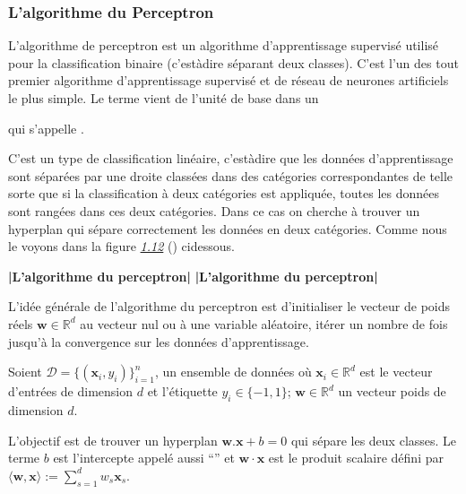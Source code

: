 \documentclass[letterpaper,11pt,english]{sphinxmanual}
\begin{document}
\subsubsection{L’algorithme du Perceptron}
\label{\detokenize{chapter3:lalgorithme-du-perceptron}}
\sphinxAtStartPar
L’algorithme de perceptron est un algorithme d’apprentissage supervisé
utilisé pour la classification binaire (c’est\sphinxhyphen{}à\sphinxhyphen{}dire séparant deux
classes). C’est l’un des tout premier algorithme d’apprentissage
supervisé et de réseau de neurones artificiels le plus simple. Le terme
vient de l’unité de base dans un
%
\begin{footnote}[8]\sphinxAtStartFootnote
{}
%
\end{footnote}
qui s’appelle .

\sphinxAtStartPar
C’est un type de classification linéaire, c’est\sphinxhyphen{}à\sphinxhyphen{}dire que les données
d’apprentissage sont séparées par une droite classées dans des
catégories correspondantes de telle sorte que si la classification à
deux catégories est appliquée, toutes les données sont rangées dans ces
deux catégories. Dans ce cas on cherche à trouver un hyperplan qui
sépare correctement les données en deux catégories. Comme nous le voyons
dans la figure {\hyperref[\detokenize{chapter3:fig:perceptron}]{\emph{1.12}}} () ci\sphinxhyphen{}dessous.

\sphinxAtStartPar
{\color{red}\bfseries{}|L’algorithme du perceptron|} {\color{red}\bfseries{}|L’algorithme du perceptron|}

\sphinxAtStartPar
L’idée générale de l’algorithme du perceptron est d’initialiser le
vecteur de poids réels \(\mathbf{w} \in \mathbb{R}^d\) au vecteur
nul ou à une variable aléatoire, itérer un nombre de fois jusqu’à la
convergence sur les données d’apprentissage.

\sphinxAtStartPar
Soient \(\mathcal{D} = \{(\mathbf{x}_i, y_i)\}^{n}_{i=1}\), un
ensemble de données où \(\mathbf{x}_i \in \mathbb{R}^d\) est le
vecteur d’entrées de dimension \(d\) et l’étiquette
\(y_i \in \{-1,1\}\); \(\mathbf{w} \in \mathbb{R}^d\) un vecteur
poids de dimension \(d\).

\sphinxAtStartPar
L’objectif est de trouver un hyperplan
\(\mathbf{w}.\mathbf{x} + b=0\) qui sépare les deux classes. Le
terme \(b\) est l’intercepte appelé aussi “” et
\(\mathbf{w}\cdot \mathbf{x}\) est le produit scalaire défini par
\(\langle \mathbf{w},\mathbf{x} \rangle := \sum_{s=1}^{d} w_{s} \mathbf{x}_{s}\).
\end{document}
